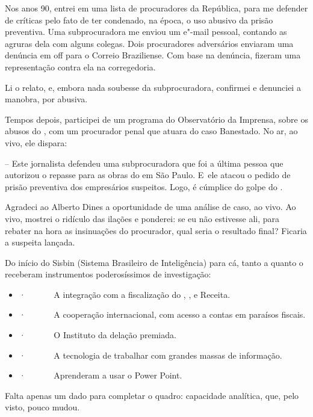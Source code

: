  

Nos anos 90, entrei em uma lista de procuradores da República, para me
defender de críticas pelo fato de ter condenado, na época, o uso abusivo
da prisão preventiva. Uma subprocuradora me enviou um e"-mail pessoal,
contando as agruras dela com alguns colegas. Dois procuradores
adversários enviaram uma denúncia em off para o Correio Braziliense.
 Com base na denúncia, fizeram uma representação contra ela na
corregedoria.

Li o relato, e, embora nada soubesse da subprocuradora, confirmei e
denunciei a manobra, por abusiva.

Tempos depois, participei de um programa do Observatório da Imprensa,
sobre os abusos do , com um procurador penal que atuara do caso
Banestado. No ar, ao vivo, ele dispara:

-- Este jornalista defendeu uma subprocuradora que foi a última pessoa
que autorizou o repasse para as obras do  em São Paulo. E~ele atacou
o pedido de prisão preventiva dos empresários suspeitos. Logo, é
cúmplice do golpe do .

Agradeci ao Alberto Dines a oportunidade de uma análise de caso, ao
vivo. Ao vivo, mostrei o ridículo das ilações e ponderei: se eu não
estivesse ali, para rebater na hora as insinuações do procurador, qual
seria o resultado final? Ficaria a suspeita lançada.

Do início do Sisbin (Sistema Brasileiro de Inteligência) para cá, tanto
a  quanto o  receberam instrumentos poderosíssimos de investigação:

\begin{itemize}
\itemsep1pt\parskip0pt
\item
  ·~~~~~~ A integração com a fiscalização do , ,  e Receita.
\item
  ·~~~~~~ A cooperação internacional, com acesso a contas em paraísos
  fiscais.
\item
  ·~~~~~~ O Instituto da delação premiada.
\item
  ·~~~~~~ A tecnologia de trabalhar com grandes massas de informação.
\item
  ·~~~~~~ Aprenderam a usar o Power Point.
\end{itemize}

Falta apenas um dado para completar o quadro: capacidade analítica, que,
pelo visto, pouco mudou.

